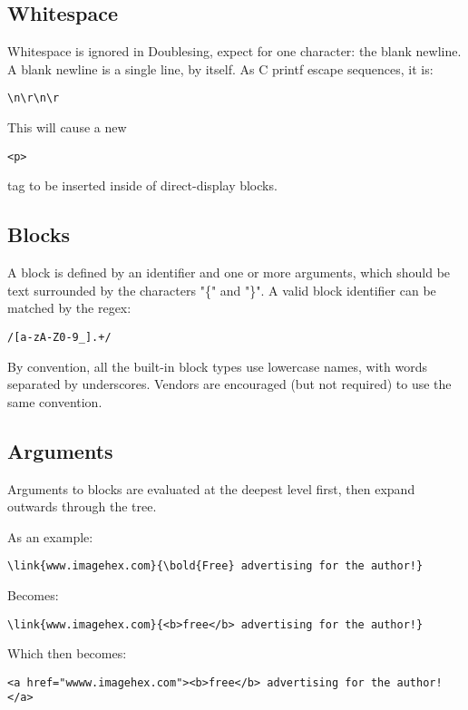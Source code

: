 \subsection{Whitespace}
Whitespace is ignored in Doublesing, expect for one character: the blank newline.
A blank newline is a single line, by itself. As C printf escape sequences, it is:
\begin{verbatim}
\n\r\n\r
\end{verbatim}

This will cause a new \begin{verbatim}<p>\end{verbatim} tag to be inserted inside of direct-display blocks.

\subsection{Blocks}
A block is defined by an identifier and one or more arguments, which should be text surrounded by the characters "\{" and "\}".
A valid block identifier can be matched by the regex:
\begin{verbatim}
/[a-zA-Z0-9_].+/
\end{verbatim}

By convention, all the built-in block types use lowercase names, with words separated by underscores.
Vendors are encouraged (but not required) to use the same convention.

\subsection{Arguments}
Arguments to blocks are evaluated at the deepest level first, then expand outwards through the tree.

As an example:

\begin{verbatim}
\link{www.imagehex.com}{\bold{Free} advertising for the author!}
\end{verbatim}

Becomes:
\begin{verbatim}
\link{www.imagehex.com}{<b>free</b> advertising for the author!}
\end{verbatim}
Which then becomes:
\begin{verbatim}
<a href="wwww.imagehex.com"><b>free</b> advertising for the author!</a>
\end{verbatim}


